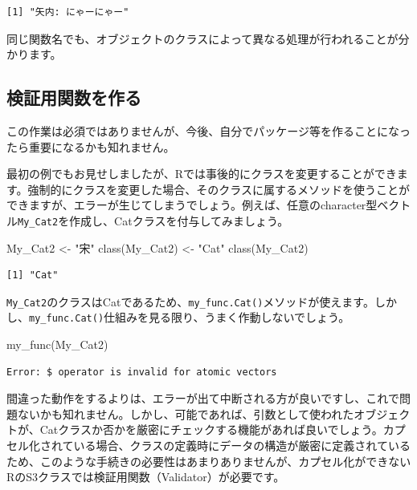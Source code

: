 \documentclass[
  a4paper,
  pandoc,
  ja=standard,
  jafont=haranoaji]{bxjsbook}
\newenvironment{Shaded}{\begin{snugshade}}{\end{snugshade}}
\newcommand{\FunctionTok}[1]{\textcolor[rgb]{0.28,0.35,0.67}{#1}}
\newcommand{\NormalTok}[1]{\textcolor[rgb]{0.00,0.48,0.65}{#1}}
\newcommand{\OtherTok}[1]{\textcolor[rgb]{0.00,0.48,0.65}{#1}}
\newcommand{\StringTok}[1]{\textcolor[rgb]{0.13,0.47,0.30}{#1}}
\begin{document}
\begin{verbatim}
[1] "矢内: にゃーにゃー"
\end{verbatim}

同じ関数名でも、オブジェクトのクラスによって異なる処理が行われることが分かります。

\hypertarget{ux691cux8a3cux7528ux95a2ux6570ux3092ux4f5cux308b}{%
\subsection{検証用関数を作る}\label{ux691cux8a3cux7528ux95a2ux6570ux3092ux4f5cux308b}}

この作業は必須ではありませんが、今後、自分でパッケージ等を作ることになったら重要になるかも知れません。

最初の例でもお見せしましたが、Rでは事後的にクラスを変更することができます。強制的にクラスを変更した場合、そのクラスに属するメソッドを使うことができますが、エラーが生じてしまうでしょう。例えば、任意のcharacter型ベクトル\texttt{My\_Cat2}を作成し、Catクラスを付与してみましょう。

\begin{Shaded}
\begin{Highlighting}[numbers=left,,]
\NormalTok{My\_Cat2 }\OtherTok{\textless{}{-}} \StringTok{"宋"}
\FunctionTok{class}\NormalTok{(My\_Cat2) }\OtherTok{\textless{}{-}} \StringTok{"Cat"}
\FunctionTok{class}\NormalTok{(My\_Cat2)}
\end{Highlighting}
\end{Shaded}

\begin{verbatim}
[1] "Cat"
\end{verbatim}

\texttt{My\_Cat2}のクラスはCatであるため、\texttt{my\_func.Cat()}メソッドが使えます。しかし、\texttt{my\_func.Cat()}仕組みを見る限り、うまく作動しないでしょう。

\begin{Shaded}
\begin{Highlighting}[numbers=left,,]
\FunctionTok{my\_func}\NormalTok{(My\_Cat2)}
\end{Highlighting}
\end{Shaded}

\begin{verbatim}
Error: $ operator is invalid for atomic vectors
\end{verbatim}

間違った動作をするよりは、エラーが出て中断される方が良いですし、これで問題ないかも知れません。しかし、可能であれば、引数として使われたオブジェクトが、Catクラスか否かを厳密にチェックする機能があれば良いでしょう。カプセル化されている場合、クラスの定義時にデータの構造が厳密に定義されているため、このような手続きの必要性はあまりありませんが、カプセル化ができないRのS3クラスでは検証用関数（Validator）が必要です。
\end{document}
